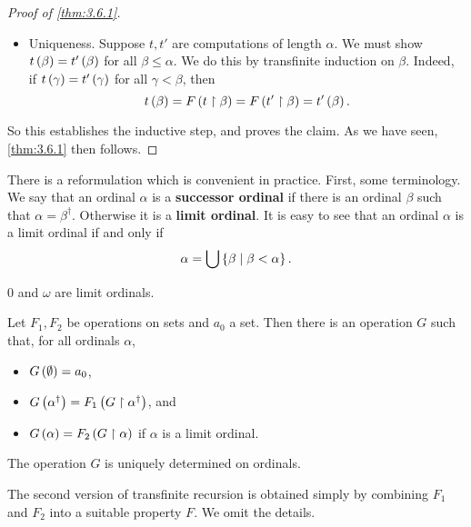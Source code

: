 \begin{proof}[Proof of \ref{thm:3.6.1}]
\begin{itemize}
for all $ \beta < \alpha $. We extend $ s $ to a function $ t $ with domain $ \alpha^\dagger $ by setting $ t\rb{\alpha} = F\rb{s} $. Then for all $ \beta \le \alpha $, we have that $ t\rb{\beta} = F\rb{t \upharpoonright \beta} $. So $ t $ is a computation of length $ \alpha $ based on $ F $.
\item Uniqueness. Suppose $ t, t' $ are computations of length $ \alpha $. We must show $ t\left( \beta \right) = t'\left( \beta \right) $ for all $ \beta \le \alpha $. We do this by transfinite induction on $ \beta $. Indeed, if $ t\left( \gamma \right) = t'\left( \gamma \right) $ for all $ \gamma < \beta $, then
$$ t\left( \beta \right) = F\left( t \upharpoonright \beta \right) = F\left( t' \upharpoonright \beta \right) = t'\left( \beta \right). $$
\end{itemize}
So this establishes the inductive step, and proves the claim. As we have seen, \ref{thm:3.6.1} then follows.
\end{proof}

There is a reformulation which is convenient in practice. First, some terminology. We say that an ordinal $ \alpha $ is a \textbf{successor ordinal} if there is an ordinal $ \beta $ such that $ \alpha = \beta^\dagger $. Otherwise it is a \textbf{limit ordinal}. It is easy to see that an ordinal $ \alpha $ is a limit ordinal if and only if
$$ \alpha = \bigcup \left\{ \beta \mid \beta < \alpha \right\}. $$

\begin{example2}
$ 0 $ and $ \omega $ are limit ordinals.
\end{example2}

\begin{theorem}
Let $ F_1, F_2 $ be operations on sets and $ a_0 $ a set. Then there is an operation $ G $ such that, for all ordinals $ \alpha $,
\begin{itemize}
\item $ G\left( \emptyset \right) = a_0 $,
\item $ G\left( \alpha^\dagger \right) = F_1\left( G \upharpoonright \alpha^\dagger \right) $, and
\item $ G\left( \alpha \right) = F_2\left( G \upharpoonright \alpha \right) $ if $ \alpha $ is a limit ordinal.
\end{itemize}
The operation $ G $ is uniquely determined on ordinals.
\end{theorem}

The second version of transfinite recursion is obtained simply by combining $ F_1 $ and $ F_2 $ into a suitable property $ F $. We omit the details.


